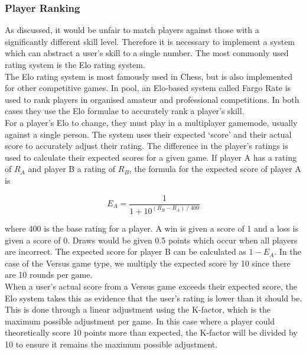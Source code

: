 \documentclass{article}
\begin{document}
\subsubsection{Player Ranking}

As discussed, it would be unfair to match players against those with a significantly different skill level. Therefore it is necessary to implement a system which can abstract a user's skill to a single number. The most commonly used rating system is the Elo rating system. \\

The Elo rating system is most famously used in Chess, but is also implemented for other competitive games. In pool, an Elo-based system called Fargo Rate is used to rank players in organised amateur and professional competitions. In both cases they use the Elo formulae to accurately rank a player's skill. \\

For a player's Elo to change, they must play in a multiplayer gamemode, usually against a single person. The system uses their expected `score' and their actual score to accurately adjust their rating. The difference in the player's ratings is used to calculate their expected scores for a given game. If player A has a rating of \(R_A\) and player B a rating of \(R_B\), the formula for the expected score of player A is 

\begin{equation*}
    E_A=\frac{1}{1+10^{(R_B-R_A)\ /\ 400}}
\end{equation*}

where \(400\) is the base rating for a player. A win is given a score of 1 and a loss is given a score of 0. Draws would be given 0.5 points which occur when all players are incorrect. The expected score for player B can be calculated as \(1-E_A\). In the case of the Versus game type, we multiply the expected score by 10 since there are 10 rounds per game. \\

When a user's actual score from a Versus game exceeds their expected score, the Elo system takes this as evidence that the user's rating is lower than it should be. This is done through a linear adjustment using the K-factor, which is the maximum possible adjustment per game. In this case where a player could theoretically score 10 points more than expected, the K-factor will be divided by 10 to ensure it remains the maximum possible adjustment. \\
\end{document}
